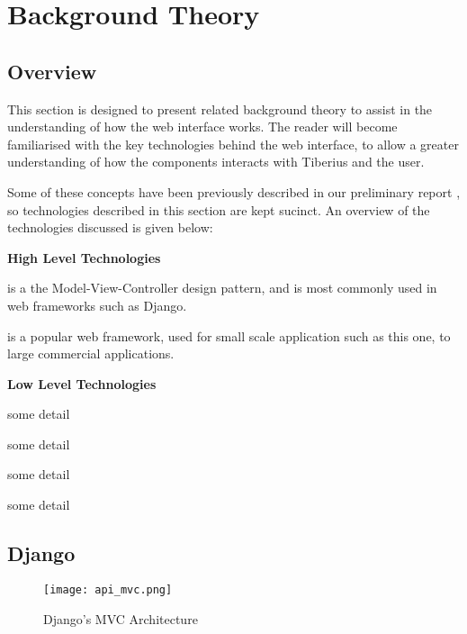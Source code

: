 \section{Background Theory}

\subsection{Overview}
This section is designed to present related background theory to assist in the
understanding of how the web interface works. The reader will become
familiarised with the key technologies behind the web interface, to allow a
greater understanding of how the components interacts with Tiberius and the
user.

Some of these concepts have been previously described in our preliminary report \cite{tibby-lit-review}, so technologies described in this section are kept sucinct. An overview of
the technologies discussed is given below:

\textbf{High Level Technologies}

\begin{description}[align=left]
\item [MVC] is a the Model-View-Controller design pattern, and is most commonly
used in web frameworks such as Django.

\item [Django] is a popular web framework, used for small scale application
such as this one, to large commercial applications.

\end{description}

\textbf{Low Level Technologies}

\begin{description}[align=left]
\item [HTTP] some detail
\item [TCP] some detail
\item [UDP] some detail
\item [VPN] some detail
\end{description}

\subsection{Django}

\begin{figure}[!htb]
\begin{center}
\texttt{[image: api\_mvc.png]}
\end{center}
\caption{Django's MVC Architecture}
\label{fig:django-mvc}
\end{figure}

